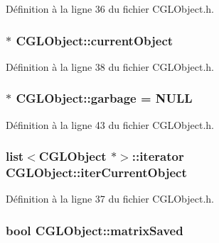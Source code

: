 Définition à la ligne 36 du fichier C\-G\-L\-Object.\-h.

\hypertarget{class_c_g_l_object_a3e0d024fd6deb36518196f57aab75d2b}{
\subsubsection[{current\-Object}]{$\ast$ C\-G\-L\-Object\-::current\-Object\hspace{0.3cm}{\ttfamily [protected]}}}\label{class_c_g_l_object_a3e0d024fd6deb36518196f57aab75d2b}


Définition à la ligne 38 du fichier C\-G\-L\-Object.\-h.

\hypertarget{class_c_g_l_object_aa042ffd6be6c676dd6fa779c2e23752d}{
\subsubsection[{garbage}]{ $\ast$ C\-G\-L\-Object\-::garbage = N\-U\-L\-L\hspace{0.3cm}{\ttfamily [static]}}}\label{class_c_g_l_object_aa042ffd6be6c676dd6fa779c2e23752d}


Définition à la ligne 43 du fichier C\-G\-L\-Object.\-h.

\hypertarget{class_c_g_l_object_a9e1debfc7948f902f40d07a7da209203}{
\subsubsection[{iter\-Current\-Object}]{\setlength{\rightskip}{0pt plus 5cm}list$<${\bf C\-G\-L\-Object} $\ast$$>$\-::iterator C\-G\-L\-Object\-::iter\-Current\-Object\hspace{0.3cm}{\ttfamily [protected]}}}\label{class_c_g_l_object_a9e1debfc7948f902f40d07a7da209203}


Définition à la ligne 37 du fichier C\-G\-L\-Object.\-h.

\hypertarget{class_c_g_l_object_a82401873b76121a112af9b824a661ba1}{
\subsubsection[{matrix\-Saved}]{\setlength{\rightskip}{0pt plus 5cm}bool C\-G\-L\-Object\-::matrix\-Saved\hspace{0.3cm}{\ttfamily [protected]}}}\label{class_c_g_l_object_a82401873b76121a112af9b824a661ba1}


